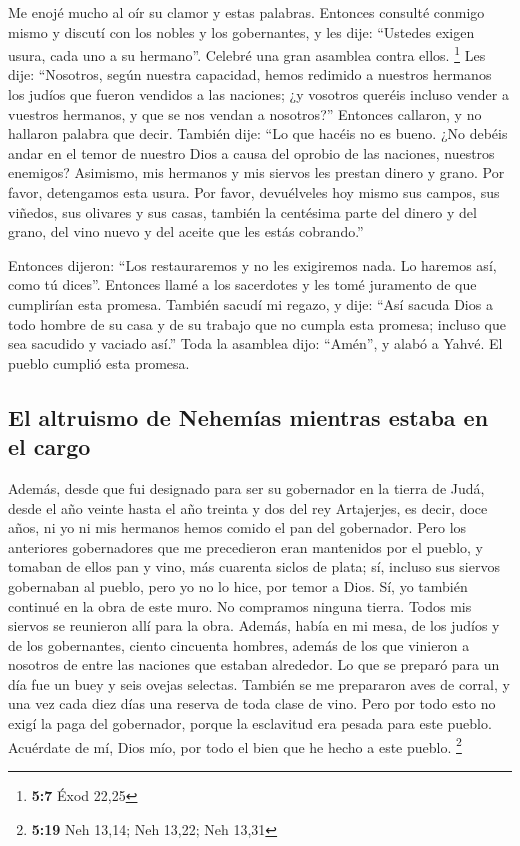  Me enojé mucho al oír su clamor y estas palabras.
 Entonces consulté conmigo mismo y discutí con los nobles
y los gobernantes, y les dije: ``Ustedes exigen usura, cada uno a su
hermano''. Celebré una gran asamblea contra ellos. \footnote{\textbf{5:7}
  Éxod 22,25}  Les dije: ``Nosotros, según nuestra
capacidad, hemos redimido a nuestros hermanos los judíos que fueron
vendidos a las naciones; ¿y vosotros queréis incluso vender a vuestros
hermanos, y que se nos vendan a nosotros?'' Entonces callaron, y no
hallaron palabra que decir.  También dije: ``Lo que hacéis
no es bueno. ¿No debéis andar en el temor de nuestro Dios a causa del
oprobio de las naciones, nuestros enemigos?  Asimismo,
mis hermanos y mis siervos les prestan dinero y grano. Por favor,
detengamos esta usura.  Por favor, devuélveles hoy mismo
sus campos, sus viñedos, sus olivares y sus casas, también la centésima
parte del dinero y del grano, del vino nuevo y del aceite que les estás
cobrando.''

 Entonces dijeron: ``Los restauraremos y no les
exigiremos nada. Lo haremos así, como tú dices''. Entonces llamé a los
sacerdotes y les tomé juramento de que cumplirían esta promesa.
 También sacudí mi regazo, y dije: ``Así sacuda Dios a
todo hombre de su casa y de su trabajo que no cumpla esta promesa;
incluso que sea sacudido y vaciado así.'' Toda la asamblea dijo:
``Amén'', y alabó a Yahvé. El pueblo cumplió esta promesa.

\hypertarget{el-altruismo-de-nehemuxedas-mientras-estaba-en-el-cargo}{%
\subsection{El altruismo de Nehemías mientras estaba en el
cargo}\label{el-altruismo-de-nehemuxedas-mientras-estaba-en-el-cargo}}

 Además, desde que fui designado para ser su gobernador
en la tierra de Judá, desde el año veinte hasta el año treinta y dos del
rey Artajerjes, es decir, doce años, ni yo ni mis hermanos hemos comido
el pan del gobernador.  Pero los anteriores gobernadores
que me precedieron eran mantenidos por el pueblo, y tomaban de ellos pan
y vino, más cuarenta siclos de plata; sí, incluso sus siervos gobernaban
al pueblo, pero yo no lo hice, por temor a Dios.  Sí, yo
también continué en la obra de este muro. No compramos ninguna tierra.
Todos mis siervos se reunieron allí para la obra. 
Además, había en mi mesa, de los judíos y de los gobernantes, ciento
cincuenta hombres, además de los que vinieron a nosotros de entre las
naciones que estaban alrededor.  Lo que se preparó para
un día fue un buey y seis ovejas selectas. También se me prepararon aves
de corral, y una vez cada diez días una reserva de toda clase de vino.
Pero por todo esto no exigí la paga del gobernador, porque la esclavitud
era pesada para este pueblo.  Acuérdate de mí, Dios mío,
por todo el bien que he hecho a este pueblo. \footnote{\textbf{5:19} Neh
  13,14; Neh 13,22; Neh 13,31}

